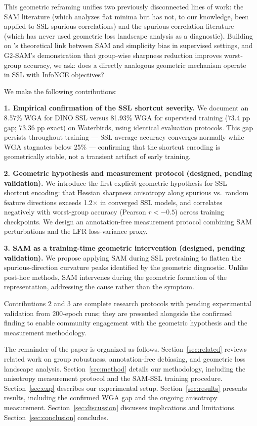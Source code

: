 This geometric reframing unifies two previously disconnected lines of work: the SAM literature (which analyzes flat minima but has not, to our knowledge, been applied to SSL spurious correlations) and the spurious correlation literature (which has never used geometric loss landscape analysis as a diagnostic). Building on \citet{gatmiry2024sam}'s theoretical link between SAM and simplicity bias in supervised settings, and G2-SAM's \citep{park2025g2sam} demonstration that group-wise sharpness reduction improves worst-group accuracy, we ask: does a directly analogous geometric mechanism operate in SSL with InfoNCE objectives?

We make the following contributions:

\textbf{1. Empirical confirmation of the SSL shortcut severity.} We document an 8.57\% WGA for DINO SSL versus 81.93\% WGA for supervised training (73.4 pp gap; 73.36 pp exact) on Waterbirds, using identical evaluation protocols. This gap persists throughout training --- SSL average accuracy converges normally while WGA stagnates below 25\% --- confirming that the shortcut encoding is geometrically stable, not a transient artifact of early training.

\textbf{2. Geometric hypothesis and measurement protocol (designed, pending validation).} We introduce the first explicit geometric hypothesis for SSL shortcut encoding: that Hessian sharpness anisotropy along spurious vs.\ random feature directions exceeds 1.2$\times$ in converged SSL models, and correlates negatively with worst-group accuracy (Pearson $r < -0.5$) across training checkpoints. We design an annotation-free measurement protocol combining SAM perturbations and the LFR loss-variance proxy.

\textbf{3. SAM as a training-time geometric intervention (designed, pending validation).} We propose applying SAM during SSL pretraining to flatten the spurious-direction curvature peaks identified by the geometric diagnostic. Unlike post-hoc methods, SAM intervenes during the geometric formation of the representation, addressing the cause rather than the symptom.

Contributions 2 and 3 are complete research protocols with pending experimental validation from 200-epoch runs; they are presented alongside the confirmed finding to enable community engagement with the geometric hypothesis and the measurement methodology.

The remainder of the paper is organized as follows. Section~\ref{sec:related} reviews related work on group robustness, annotation-free debiasing, and geometric loss landscape analysis. Section~\ref{sec:method} details our methodology, including the anisotropy measurement protocol and the SAM-SSL training procedure. Section~\ref{sec:exp} describes our experimental setup. Section~\ref{sec:results} presents results, including the confirmed WGA gap and the ongoing anisotropy measurement. Section~\ref{sec:discussion} discusses implications and limitations. Section~\ref{sec:conclusion} concludes.
